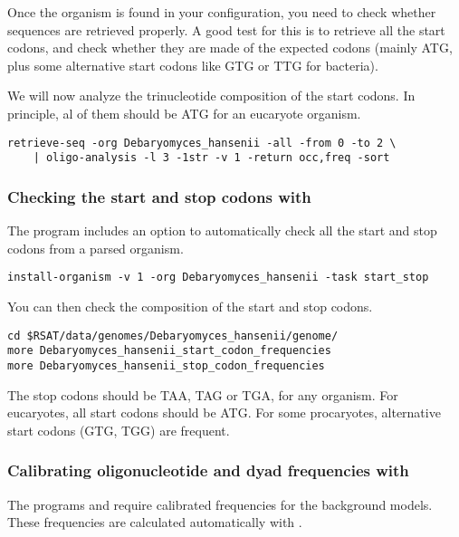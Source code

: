 Once the organism is found in your configuration, you need to check
whether sequences are retrieved properly. A good test for this is to
retrieve all the start codons, and check whether they are made of the
expected codons (mainly ATG, plus some alternative start codons like
GTG or TTG for bacteria).

We will now analyze the trinucleotide composition of the start
codons. In principle, al of them should be ATG for an eucaryote
organism.

\begin{verbatim}
retrieve-seq -org Debaryomyces_hansenii -all -from 0 -to 2 \
    | oligo-analysis -l 3 -1str -v 1 -return occ,freq -sort
\end{verbatim}

\subsubsection{Checking the start and stop codons with }

The program  includes an option to
automatically check all the start and stop codons from a parsed
organism.

\begin{verbatim}
install-organism -v 1 -org Debaryomyces_hansenii -task start_stop
\end{verbatim}

You can then check the composition of the start and stop codons.

\begin{verbatim}
cd $RSAT/data/genomes/Debaryomyces_hansenii/genome/
more Debaryomyces_hansenii_start_codon_frequencies
more Debaryomyces_hansenii_stop_codon_frequencies
\end{verbatim}

The stop codons should be TAA, TAG or TGA, for any organism. For
eucaryotes, all start codons should be ATG. For some procaryotes,
alternative start codons (GTG, TGG) are frequent.

\subsubsection{Calibrating oligonucleotide and dyad frequencies with }

The programs  and 
  require calibrated frequencies for the background models. These
  frequencies are calculated automatically with
  .


